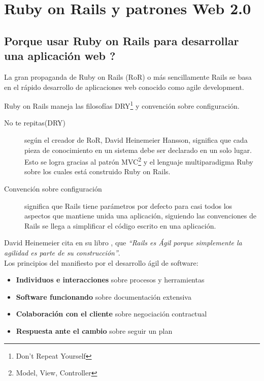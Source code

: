 \chapter{Ruby on Rails y patrones Web 2.0} %
\label{cha:ruby_on_rails_y_patrones_web_2_0}

  \section{Porque usar Ruby on Rails para desarrollar una aplicación web ?} %
  \label{sec:porque_usar_ruby_on_rails_para_desarrollar_una_aplicacion_web}

    La gran propaganda de Ruby on Rails (RoR) o más sencillamente Rails
    se basa en el rápido desarrollo de aplicaciones web conocido como agile development.

    Ruby on Rails maneja las filosofías DRY\footnote{Don’t Repeat Yourself} y convención sobre configuración. 

    \begin{description}
      \item[No te repitas(DRY)] según el creador de RoR, David Heinemeier Hansson, 
      significa que cada pieza de conocimiento en un sistema 
      debe ser declarado en un solo lugar.\cite{awdr4e} 
      Esto se logra gracias al patrón MVC\footnote{Model, View, Controller} 
      y el lenguaje multiparadigma Ruby sobre los cuales está construido Ruby on Rails.\\
      
      \item[Convención sobre configuración] significa que Rails tiene parámetros por 
      defecto para casi todos los aspectos que mantiene unida una aplicación, 
      siguiendo  las convenciones de Rails se llega a simplificar el código escrito en una aplicación.\\
    \end{description}


    David Heinemeier cita en su libro \cite{awdr4e}, que \emph{“Rails es Ágil porque 
    simplemente la agilidad es parte de su construcción”}.\\

    Los principios del manifiesto por el desarrollo ágil de software:
    \begin{itemize}
      \item \textbf{Individuos e interacciones} sobre procesos y herramientas
      \item \textbf{Software funcionando} sobre documentación extensiva
      \item \textbf{Colaboración con el cliente} sobre negociación contractual
      \item \textbf{Respuesta ante el cambio} sobre seguir un plan
    \end{itemize}
    
